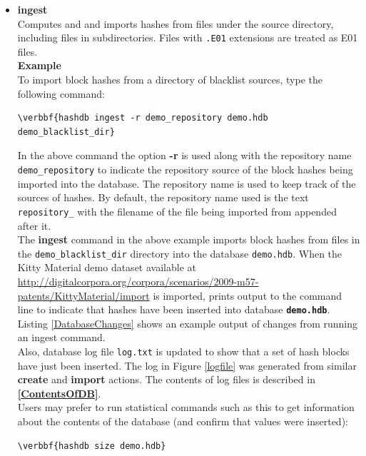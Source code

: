 \documentclass[11pt,fleqn]{article} %
\begin{document}
\begin{itemize}
\item \textbf{ingest}\\
Computes and and imports hashes from files under the source directory, including files in subdirectories. Files with \verb+.E01+ extensions are treated as E01 files.\\

\textbf{Example}\\
To import block hashes from a directory of blacklist sources, type the following command:
\begin{Verbatim}[commandchars=\\\{\}]
\verbbf{hashdb ingest -r demo_repository demo.hdb demo_blacklist_dir}
\end{Verbatim}
In the above command the option \textbf{-r} is used along with the repository name \texttt{demo\_repository} to indicate the repository source of the block hashes being imported into the database. The repository name is used to keep track of the sources of hashes. By default, the repository name used is the text \texttt{repository\_} with the filename of the file being imported from appended after it.\\

The \textbf{ingest} command in the above example imports block hashes from files in the \texttt{demo\_blacklist\_dir} directory into the database \texttt{demo.hdb}. When the Kitty Material demo dataset available at \url{http://digitalcorpora.org/corpora/scenarios/2009-m57-patents/KittyMaterial/import} is imported, \hdb prints output to the command line to indicate that hashes have been inserted into database \texttt{\textbf{demo.hdb}}. Listing \ref{DatabaseChanges} shows an example output of changes from running an ingest command.\\

Also, database log file \texttt{log.txt} is updated to show that a set of hash blocks have just been inserted. The log in Figure \ref{logfile} was generated from similar \textbf{create} and \textbf{import} actions.  The contents of log files is described in \textbf{\autoref{ContentsOfDB}}.\\

Users may prefer to run statistical commands such as this to get information about the contents of the database (and confirm that values were inserted):
\begin{Verbatim}[commandchars=\\\{\}]
\verbbf{hashdb size demo.hdb}
\end{Verbatim}


\end{itemize}
\end{document}
